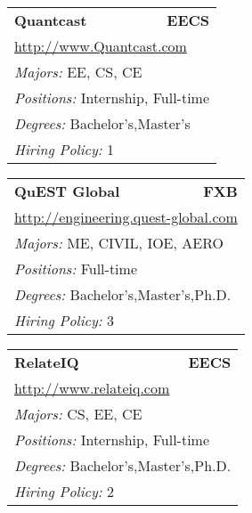 \documentclass[twoside]{article}
\begin{document}
\begin{center}
\begin{multicols}{3}
\begin{FlushLeft}
\begin{minipage}{.9\columnwidth}\begin{tabularx}{.95\columnwidth}{Xr}
                 {\Large\bf Quantcast} & {\Large\bf EECS}\\
    \multicolumn{2}{p{.95\columnwidth}}{\url{http://www.Quantcast.com}}\\
    \multicolumn{2}{p{.95\columnwidth}}{\emph{Majors:} EE, CS, CE}\\
    \multicolumn{2}{p{.95\columnwidth}}{\emph{Positions:} Internship, Full-time}\\
    \multicolumn{2}{p{.95\columnwidth}}{\emph{Degrees:} Bachelor's,Master's}\\
    \multicolumn{2}{p{.95\columnwidth}}{\emph{Hiring Policy:} 1}\\
    \end{tabularx}
    
\end{minipage}
 
\begin{minipage}{.9\columnwidth}\begin{tabularx}{.95\columnwidth}{Xr}
                 {\Large\bf QuEST Global} & {\Large\bf FXB}\\
    \multicolumn{2}{p{.95\columnwidth}}{\url{http://engineering.quest-global.com}}\\
    \multicolumn{2}{p{.95\columnwidth}}{\emph{Majors:} ME, CIVIL, IOE, AERO}\\
    \multicolumn{2}{p{.95\columnwidth}}{\emph{Positions:} Full-time}\\
    \multicolumn{2}{p{.95\columnwidth}}{\emph{Degrees:} Bachelor's,Master's,Ph.D.}\\
    \multicolumn{2}{p{.95\columnwidth}}{\emph{Hiring Policy:} 3}\\
    \end{tabularx}
    
\end{minipage}
 
\begin{minipage}{.9\columnwidth}\begin{tabularx}{.95\columnwidth}{Xr}
                 {\Large\bf RelateIQ} & {\Large\bf EECS}\\
    \multicolumn{2}{p{.95\columnwidth}}{\url{http://www.relateiq.com}}\\
    \multicolumn{2}{p{.95\columnwidth}}{\emph{Majors:} CS, EE, CE}\\
    \multicolumn{2}{p{.95\columnwidth}}{\emph{Positions:} Internship, Full-time}\\
    \multicolumn{2}{p{.95\columnwidth}}{\emph{Degrees:} Bachelor's,Master's,Ph.D.}\\
    \multicolumn{2}{p{.95\columnwidth}}{\emph{Hiring Policy:} 2}\\
    \end{tabularx}
    

\end{minipage}
\end{FlushLeft}
\end{multicols}
\end{center}
\end{document}
